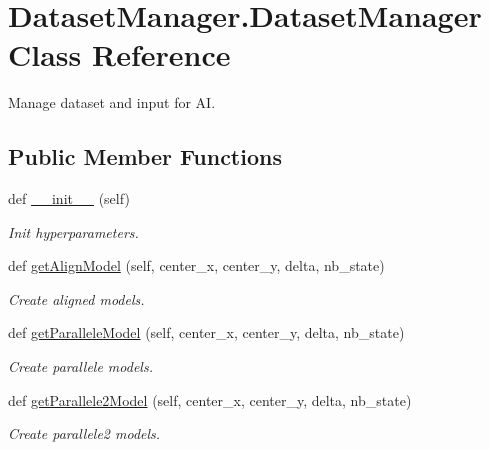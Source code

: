 \hypertarget{classDatasetManager_1_1DatasetManager}{}\section{Dataset\+Manager.\+Dataset\+Manager Class Reference}
\label{classDatasetManager_1_1DatasetManager}


Manage dataset and input for AI.  


\subsection*{Public Member Functions}
\begin{DoxyCompactItemize}
\item 
\mbox{\label{classDatasetManager_1_1DatasetManager_a8a2a10a24298cd8be7e947a235aa6ad4}} 
def \mbox{\hyperlink{classDatasetManager_1_1DatasetManager_a8a2a10a24298cd8be7e947a235aa6ad4}{\+\_\+\+\_\+init\+\_\+\+\_\+}} (self)
\begin{DoxyCompactList}\small\item\em Init hyperparameters. \end{DoxyCompactList}\item 
def \mbox{\hyperlink{classDatasetManager_1_1DatasetManager_a35353a0d4eb0a3821142d78c88987aea}{get\+Align\+Model}} (self, center\+\_\+x, center\+\_\+y, delta, nb\+\_\+state)
\begin{DoxyCompactList}\small\item\em Create aligned models. \end{DoxyCompactList}\item 
def \mbox{\hyperlink{classDatasetManager_1_1DatasetManager_a3aff4da481f1011c6332b6046d6b2b75}{get\+Parallele\+Model}} (self, center\+\_\+x, center\+\_\+y, delta, nb\+\_\+state)
\begin{DoxyCompactList}\small\item\em Create parallele models. \end{DoxyCompactList}\item 
def \mbox{\hyperlink{classDatasetManager_1_1DatasetManager_a5a4ddca426c46443064d620a20924b92}{get\+Parallele2\+Model}} (self, center\+\_\+x, center\+\_\+y, delta, nb\+\_\+state)
\begin{DoxyCompactList}\small\item\em Create parallele2 models. \end{DoxyCompactList}\item 

\end{DoxyCompactItemize}

